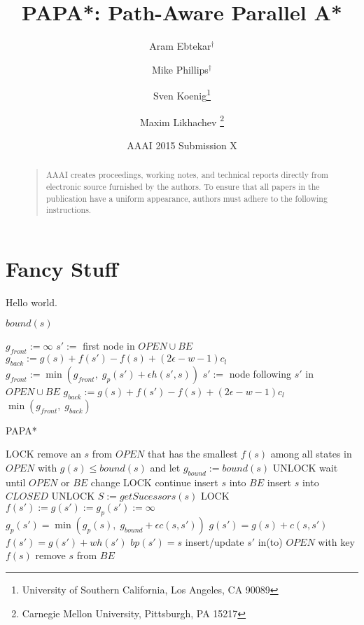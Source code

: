 \documentclass[letterpaper]{article}
\begin{document}
%
\title{PAPA*: Path-Aware Parallel A*}
\author{Aram Ebtekar$^\dagger$ \and Mike Phillips$^\dagger$ \and Sven Koenig\thanks{University of Southern California, Los Angeles, CA 90089} \and Maxim Likhachev%
\thanks{Carnegie Mellon University, Pittsburgh, PA 15217}%
%
}
\author{AAAI 2015 Submission X}%
\maketitle
\begin{abstract}
\begin{quote}
AAAI creates proceedings, working notes, and technical reports directly from electronic source furnished by the authors. To ensure that all papers in the publication have a uniform appearance, authors must adhere to the following instructions. 
\end{quote}
\end{abstract}

\section{Fancy Stuff}

Hello world.

\begin{algorithm}
\caption{$bound(s)$}
\label{alg:bound}
\begin{algorithmic}
\STATE $g_{front} := \infty$
\STATE $s' :=$ first node in $OPEN \cup BE$
\STATE $g_{back} := g(s) + f(s') - f(s) + (2\epsilon-w-1) c_l$
\STATE $g_{front} := \min(g_{front},\;g_p(s') + \epsilon h(s',s))$
\STATE $s' :=$ node following $s'$ in $OPEN \cup BE$
\STATE $g_{back} := g(s) + f(s') - f(s) + (2\epsilon-w-1) c_l$
\ENDWHILE
\RETURN $\min(g_{front},\;g_{back})$
\end{algorithmic}
\end{algorithm}

\begin{algorithm}
\caption{PAPA*}
\label{alg:PAPA*}
\begin{algorithmic}
\STATE LOCK
\STATE remove an $s$ from $OPEN$ that has the smallest $f(s)$ among all states in $OPEN$ with $g(s) \le bound(s)$ and let $g_{bound} := bound(s)$
\STATE UNLOCK
\STATE wait until $OPEN$ or $BE$ change
\STATE LOCK
\STATE continue
\ENDIF
\STATE insert $s$ into $BE$
\STATE insert $s$ into $CLOSED$
\STATE UNLOCK
\STATE $S := getSucessors(s)$
\STATE LOCK
\STATE $f(s') := g(s') := g_p(s') := \infty$
\ENDIF
{}
\STATE $g_p(s') = \min(g_p(s),\; g_{bound} + \epsilon c(s,s'))$
\STATE $g(s') = g(s) + c(s,s')$
\STATE $f(s') = g(s') + wh(s')$
\STATE $bp(s') = s$
\STATE insert/update $s'$ in(to) $OPEN$ with key $f(s)$
\ENDIF
\ENDIF
\ENDFOR
\STATE remove $s$ from $BE$
\ENDWHILE
\end{algorithmic}
\end{algorithm}
\end{document}
